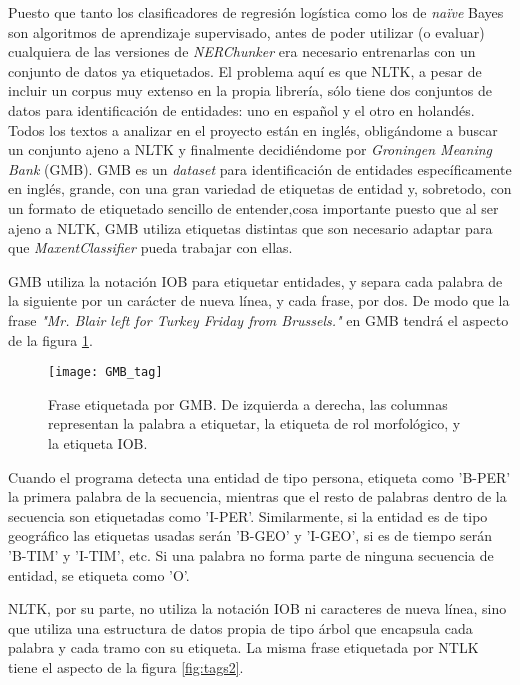 \documentclass{pre-tfg}
\begin{document}

Puesto que tanto los clasificadores de regresión logística como los de \textit{naïve} Bayes son algoritmos de aprendizaje supervisado, antes de poder utilizar (o evaluar) cualquiera de las versiones de \textit{NERChunker} era necesario entrenarlas con un conjunto de datos ya etiquetados. El problema aquí es que NLTK, a pesar de incluir un corpus muy extenso en la propia librería, sólo tiene dos conjuntos de datos para identificación de entidades: uno en español y el otro en holandés. Todos los textos a analizar en el proyecto están en inglés, obligándome a buscar un conjunto ajeno a NLTK y finalmente decidiéndome por \textit{Groningen Meaning Bank} (GMB). GMB es un \textit{dataset} para identificación de entidades específicamente en inglés, grande, con una gran variedad de etiquetas de entidad y, sobretodo, con un formato de etiquetado sencillo de entender,cosa importante puesto que al ser ajeno a NLTK, GMB utiliza etiquetas distintas que son necesario adaptar para que \textit{MaxentClassifier} pueda trabajar con ellas.

GMB utiliza la notación IOB para etiquetar entidades, y separa cada palabra de la siguiente por un carácter de nueva línea, y cada frase, por dos. De modo que la frase \textit{"Mr. Blair left for Turkey Friday from Brussels."} en GMB tendrá el aspecto de la figura \ref{fig:tags1}.

\begin{figure}[h]
	\texttt{[image: GMB\_tag]}
	\caption{Frase etiquetada por GMB. De izquierda a derecha, las columnas representan la palabra a etiquetar, la etiqueta de rol morfológico, y la etiqueta IOB.}
	\label{fig:tags1}
	\centering
\end{figure}

Cuando el programa detecta una entidad de tipo persona, etiqueta como 'B-PER' la primera palabra de la secuencia, mientras que el resto de palabras dentro de la secuencia son etiquetadas como 'I-PER'. Similarmente, si la entidad es de tipo geográfico las etiquetas usadas serán 'B-GEO' y 'I-GEO', si es de tiempo serán 'B-TIM' y 'I-TIM', etc. Si una palabra no forma parte de ninguna secuencia de entidad, se etiqueta como 'O'.

NLTK, por su parte, no utiliza la notación IOB  ni caracteres de nueva línea, sino que utiliza una estructura de datos propia de tipo árbol que encapsula cada palabra y cada tramo con su etiqueta. La misma frase etiquetada por NTLK tiene el aspecto de la figura \ref{fig:tags2}.
\end{document}

